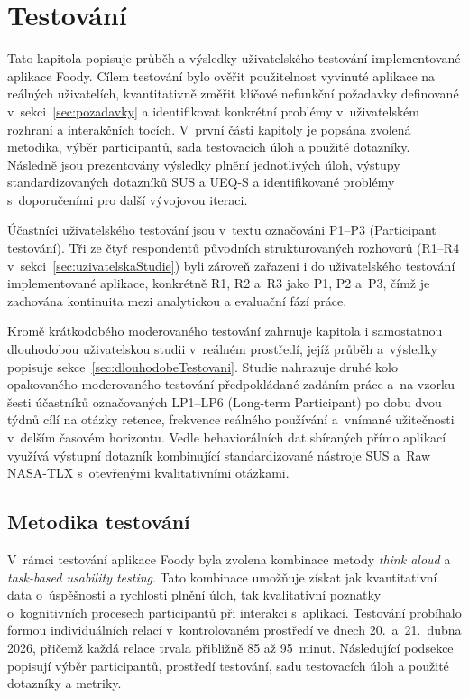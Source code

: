 \chapter{Testování}
\label{ch:testovani}

Tato kapitola popisuje průběh a výsledky uživatelského testování implementované aplikace Foody.
Cílem testování bylo ověřit použitelnost vyvinuté aplikace na reálných uživatelích, kvantitativně změřit klíčové nefunkční požadavky definované v~sekci~\ref{sec:pozadavky} a identifikovat konkrétní problémy v~uživatelském rozhraní a interakčních tocích.
V~první části kapitoly je popsána zvolená metodika, výběr participantů, sada testovacích úloh a použité dotazníky.
Následně jsou prezentovány výsledky plnění jednotlivých úloh, výstupy standardizovaných dotazníků SUS a UEQ-S a identifikované problémy s~doporučeními pro další vývojovou iteraci.

Účastníci uživatelského testování jsou v~textu označováni P1--P3 (Participant testování).
Tři ze čtyř respondentů původních strukturovaných rozhovorů (R1--R4 v~sekci~\ref{sec:uzivatelskaStudie}) byli zároveň zařazeni i do uživatelského testování implementované aplikace, konkrétně R1, R2 a~R3 jako P1, P2 a~P3, čímž je zachována kontinuita mezi analytickou a evaluační fází práce.

Kromě krátkodobého moderovaného testování zahrnuje kapitola i samostatnou dlouhodobou uživatelskou studii v~reálném prostředí, jejíž průběh a~výsledky popisuje sekce~\ref{sec:dlouhodobeTestovani}.
Studie nahrazuje druhé kolo opakovaného moderovaného testování předpokládané zadáním práce a~na vzorku šesti účastníků označovaných LP1--LP6 (Long-term Participant) po dobu dvou týdnů cílí na otázky retence, frekvence reálného používání a~vnímané užitečnosti v~delším časovém horizontu.
Vedle behaviorálních dat sbíraných přímo aplikací využívá výstupní dotazník kombinující standardizované nástroje SUS a~Raw NASA-TLX s~otevřenými kvalitativními otázkami.

\section{Metodika testování}
\label{sec:metodikaTestovani}

V~rámci testování aplikace Foody byla zvolena kombinace metody \emph{think aloud} a \emph{task-based usability testing}.
Tato kombinace umožňuje získat jak kvantitativní data o~úspěšnosti a rychlosti plnění úloh, tak kvalitativní poznatky o~kognitivních procesech participantů při interakci s~aplikací.
Testování probíhalo formou individuálních relací v~kontrolovaném prostředí ve dnech 20.~a~21.~dubna 2026, přičemž každá relace trvala přibližně 85 až 95~minut.
Následující podsekce popisují výběr participantů, prostředí testování, sadu testovacích úloh a použité dotazníky a metriky.

